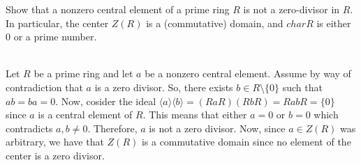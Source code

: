 Show that a nonzero central element of a prime ring $R$ is not a zero-divisor in $R$. In particular,
the center $Z(R)$ is a (commutative) domain, and $char R$ is either $0$ or a prime number.\\

\begin{solution}\renewcommand{\qedsymbol}{}\ \\
    Let $R$ be a prime ring and let $a$ be a nonzero central element. Assume by way of contradiction
    that $a$ is a zero divisor. So, there exists $b\in R\setminus\{0\}$ such that $ab=ba=0$. Now,
    cosider the ideal $\langle a\rangle\langle b\rangle=(RaR)(RbR)=RabR=\{0\}$ since $a$ is a central
    element of $R$. This means that either $a=0$ or $b=0$ which contradicts $a,b\neq0$. Therefore, $a$
    is not a zero divisor. Now, since $a\in Z(R)$ was arbitrary, we have that $Z(R)$ is a commutative
    domain since no element of the center is a zero divisor. 

\end{solution}